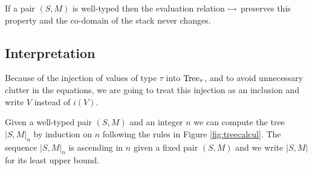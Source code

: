 \begin{lemma}[Safety]
    If a pair $(S,M)$ is well-typed then the
    evaluation relation $\rightarrowtail$ preserves this property 
    and the co-domain of the stack never changes.
\end{lemma}

%
%    


\subsection{Interpretation}

Because of the injection of values of type $\tau$ into $\textnormal{Tree}_\tau$,
and to avoid unnecessary clutter in the equations, we are going to treat 
this injection as an inclusion and write $V$ instead of $i(V)$.


\begin{definition}
    Given a well-typed pair $(S,M)$ and an integer $n$ we can 
    compute the tree $|S,M|_n$ by induction on $n$ 
    following the rules in Figure \ref{fig:treecalcul}.
    The sequence $|S,M|_n$ is ascending in $n$ given a fixed 
    pair $(S,M)$ and we write $|S,M|$ for its least upper bound.
\end{definition}

